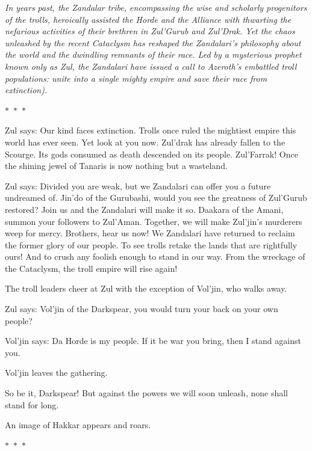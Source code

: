 \textit{In years past, the Zandalar tribe, encompassing the wise and scholarly progenitors of the trolls, heroically assisted the Horde and the Alliance with thwarting the nefarious activities of their brethren in Zul'Gurub and Zul'Drak. Yet the chaos unleashed by the recent Cataclysm has reshaped the Zandalari's philosophy about the world and the dwindling remnants of their race. Led by a mysterious prophet known only as Zul, the Zandalari have issued a call to Azeroth's embattled troll populations: unite into a single mighty empire and save their race from extinction).}


\begin{center}
  $\ast$~$\ast$~$\ast$
\end{center}

Zul says: Our kind faces extinction. Trolls once ruled the mightiest empire this world has ever seen. Yet look at you now. Zul'drak has already fallen to the Scourge. Its gods consumed as death descended on its people. Zul'Farrak! Once the shining jewel of Tanaris is now nothing but a wasteland.

Zul says: Divided you are weak, but we Zandalari can offer you a future undreamed of. Jin'do of the Gurubashi, would you see the greatness of Zul'Gurub restored? Join us and the Zandalari will make it so. Daakara of the Amani, summon your followers to Zul'Aman. Together, we will make Zul'jin's murderers weep for mercy. Brothers, hear us now! We Zandalari have returned to reclaim the former glory of our people. To see trolls retake the lands that are rightfully ours! And to crush any foolish enough to stand in our way. From the wreckage of the Cataclysm, the troll empire will rise again!

The troll leaders cheer at Zul with the exception of Vol'jin, who walks away.

Zul says: Vol'jin of the Darkspear, you would turn your back on your own people?

Vol'jin says: Da Horde is my people. If it be war you bring, then I stand against you.

Vol'jin leaves the gathering.

So be it, Darkspear! But against the powers we will soon unleash, none shall stand for long.

An image of Hakkar appears and roars.

\begin{center}
  $\ast$~$\ast$~$\ast$
\end{center}

